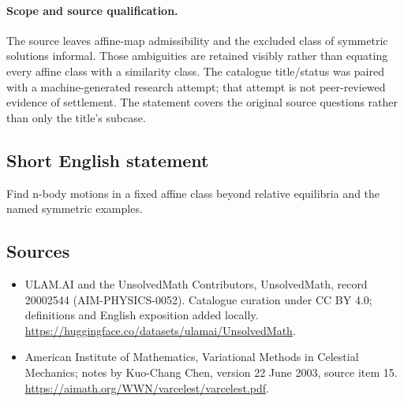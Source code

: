 \documentclass[11pt]{article}
\begin{document}
\paragraph{Scope and source qualification.}The source leaves affine-map admissibility and the excluded class of symmetric solutions informal. Those ambiguities are retained visibly rather than equating every affine class with a similarity class. The catalogue title/status was paired with a machine-generated research attempt; that attempt is not peer-reviewed evidence of settlement. The statement covers the original source questions rather than only the title’s subcase.
\subsection{Short English statement}
Find n-body motions in a fixed affine class beyond relative equilibria and the named symmetric examples.
\subsection{Sources}
\begin{itemize}
\item[\hypertarget{source:20002544:1}{S1}] ULAM.AI and the UnsolvedMath Contributors, UnsolvedMath, record 20002544 (AIM-PHYSICS-0052). Catalogue curation under CC BY 4.0; definitions and English exposition added locally.
\url{https://huggingface.co/datasets/ulamai/UnsolvedMath}.
\item[\hypertarget{source:20002544:2}{S2}] American Institute of Mathematics, Variational Methods in Celestial Mechanics; notes by Kuo-Chang Chen, version 22 June 2003, source item 15.
\url{https://aimath.org/WWN/varcelest/varcelest.pdf}.
\end{itemize}
\label{end:20002544}
\end{document}

